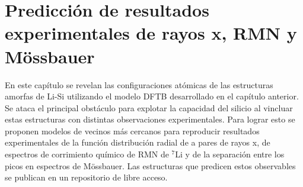 \chapter{Predicción de resultados experimentales de rayos x, RMN y Mössbauer}\label{ch:prediccion}
\thispagestyle{empty}

\vspace{50pt}

\begin{adjustwidth}{50pt}{50pt}
    En este capítulo se revelan las configuraciones atómicas de las estructuras
    amorfas de Li-Si utilizando el modelo DFTB desarrollado en el capítulo 
    anterior. Se ataca el principal obstáculo para explotar la capacidad 
    del silicio al vincluar estas estructuras con distintas observaciones 
    experimentales. Para lograr esto se proponen modelos de vecinos más 
    cercanos para reproducir resultados experimentales de la función 
    distribución radial de a pares de rayos x, de espectros de corrimiento 
    químico de RMN de $^7$Li y de la separación entre los picos en espectros
    de Mössbauer. Las estructuras que predicen estos observables se publican
    en un repositorio de libre acceso.
\end{adjustwidth}

\clearpage
\newpage
\thispagestyle{empty}
\mbox{}
\newpage








